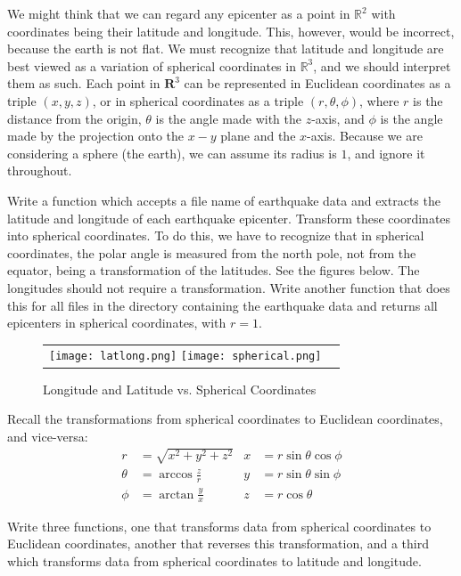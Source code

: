 We might think that we can regard any epicenter as a point in $\mathbb{R}^{2}$ with coordinates being their latitude and longitude. This, however, would be incorrect, because the earth is not flat. We must recognize that latitude and longitude are best viewed as a variation of spherical coordinates in $\mathbb{R}^{3}$, and we should interpret them as such. Each point in $\mathbf{R}^{3}$ can be represented in Euclidean coordinates as a triple $(x,y,z)$, or in spherical coordinates as a triple $(r,\theta,\phi)$, where $r$ is the distance from the origin, $\theta$ is the angle made with the $z$-axis, and $\phi$ is the angle made by the projection onto the $x-y$ plane and the $x$-axis. Because we are considering a sphere (the earth), we can assume its radius is $1$, and ignore it throughout.

\begin{problem}
Write a function which accepts a file name of earthquake data and extracts the latitude and longitude of each earthquake epicenter. Transform these coordinates into spherical coordinates. To do this, we have to recognize that in spherical coordinates, the polar angle is measured from the north pole, not from the equator, being a transformation of the latitudes. See the figures below. The longitudes should not require a transformation. Write another function that does this for all files in the directory containing the earthquake data and returns all epicenters in spherical coordinates, with $r = 1$.
\end{problem}

\begin{figure}[h]
\centering
	\begin{tabular}{cc}
		\texttt{[image: latlong.png]}
		\texttt{[image: spherical.png]}
	\end{tabular}
	\caption{Longitude and Latitude vs. Spherical Coordinates}
\end{figure}

Recall the transformations from spherical coordinates to Euclidean coordinates, and vice-versa:
\begin{align*}
r & = \sqrt{x^{2} + y^{2} + z^{2}} & x & = r \sin \theta \cos \phi \\
\theta & = \arccos \frac{z}{r} & y & = r \sin \theta \sin \phi \\
\phi & = \arctan \frac{y}{x} & z & = r \cos \theta
\end{align*}

\begin{problem}
Write three functions, one that transforms data from spherical coordinates to Euclidean coordinates, another that reverses this transformation, and a third which transforms data from spherical coordinates to latitude and longitude.
\end{problem}

